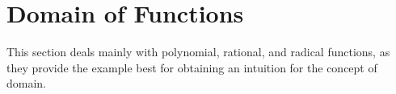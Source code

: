 \section{Domain of Functions}

This section deals mainly with polynomial, rational, and radical functions, as they provide the example best for obtaining an intuition for the concept of domain.